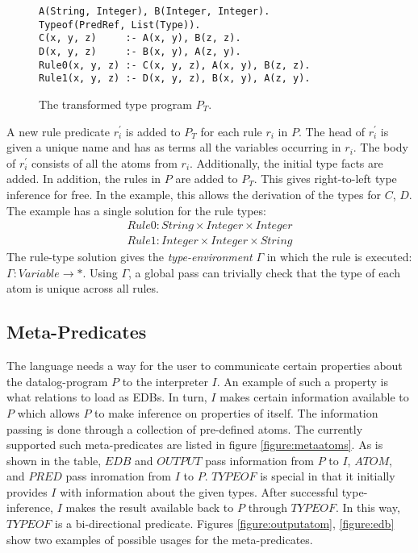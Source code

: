 \begin{figure}[!ht]
\begin{verbatim}
A(String, Integer), B(Integer, Integer).
Typeof(PredRef, List(Type)).
C(x, y, z)     :- A(x, y), B(z, z).
D(x, y, z)     :- B(x, y), A(z, y).
Rule0(x, y, z) :- C(x, y, z), A(x, y), B(z, z).
Rule1(x, y, z) :- D(x, y, z), B(x, y), A(z, y).
\end{verbatim}
\caption{The transformed type program $P_T$.}
\label{figure:sourcePT}
\end{figure}
\noindent
A new rule predicate $r^{'}_i$ is added to $P_T$ for each rule $r_i$ in $P$. The head of $r^{'}_i$ is given a unique name and has as terms all the variables occurring in $r_i$. The body of $r^{'}_i$ consists of all the atoms from $r_i$. Additionally, the initial type facts are added. In addition, the rules in $P$ are added to $P_T$. This gives right-to-left type inference for free. In the example, this allows the derivation of the types for $C$, $D$. 
The example has a single solution for the rule types:
\begin{align*}
Rule0 : String  \times Integer \times Integer\\
Rule1 : Integer \times Integer \times String
\end{align*}
The rule-type solution gives the \textit{type-environment} $\Gamma$ in which the rule is executed: $\Gamma : Variable \rightarrow *$. Using $\Gamma$, a global pass can trivially check that the type of each atom is unique across all rules.

\subsection{Meta-Predicates}
The language needs a way for the user to communicate certain properties about the datalog-program $P$ to the interpreter $I$.
An example of such a property is what relations to load as EDBs.
In turn, $I$ makes certain information available to $P$ which allows $P$ to make inference on properties of itself.
The information passing is done through a collection of pre-defined atoms. The currently supported such meta-predicates are listed in figure \ref{figure:metaatoms}. As is shown in the table, $EDB$ and $OUTPUT$ pass information from $P$ to $I$, $ATOM$, and $PRED$ pass inromation from $I$ to $P$. $TYPEOF$ is special in that it initially provides $I$ with information about the given types. After successful type-inference, $I$ makes the result available back to $P$ through $TYPEOF$. In this way, $TYPEOF$ is a bi-directional predicate. Figures \ref{figure:outputatom}, \ref{figure:edb} show two examples of possible usages for the meta-predicates.

